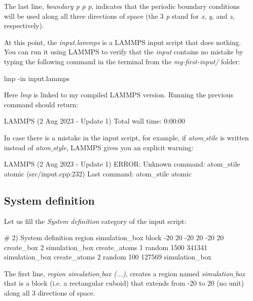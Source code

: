 \noindent The last line, \textit{boundary p p p}, indicates that the
periodic boundary conditions will be used along all three
directions of space (the 3 \textit{p} stand for \textit{x}, \textit{y}, and \textit{z},
respectively).

\vspace{0.25cm} \noindent At this point, the \textit{input.lammps} is a 
LAMMPS input script that does nothing.
You can run it using LAMMPS to verify that the \textit{input} contains
no mistake by typing the following command in the terminal
from the \textit{my-first-input/}  folder:

\begin{lcverbatim}
lmp -in input.lammps
\end{lcverbatim}

\noindent Here \textit{lmp} is linked to my compiled LAMMPS version.
Running the previous command should return:

\begin{lcverbatim}
LAMMPS (2 Aug 2023 - Update 1)
Total wall time: 0:00:00
\end{lcverbatim}

\noindent In case there is a mistake in the input script, for example, if
\textit{atom$\_$stile} is written instead of \textit{atom$\_$style}, LAMMPS
gives you an explicit warning:

\begin{lcverbatim}
LAMMPS (2 Aug 2023 - Update 1)
ERROR: Unknown command: atom_stile  atomic (src/input.cpp:232)
Last command: atom_stile atomic
\end{lcverbatim}

\subsection{System definition}
Let us fill the \textit{System definition} category of the input script:

\begin{lcverbatim}
# 2) System definition
region simulation_box block -20 20 -20 20 -20 20
create_box 2 simulation_box
create_atoms 1 random 1500 341341 simulation_box
create_atoms 2 random 100 127569 simulation_box
\end{lcverbatim}

\noindent The first line, \textit{region simulation$\_$box (...)}, creates a region
named \textit{simulation$\_$box} that is a block (i.e. a rectangular cuboid) that
extends from -20 to 20 (no unit) along all 3 directions of space.

